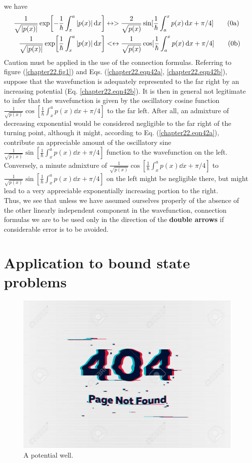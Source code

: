 we have
\begin{align}
\frac{1}{\sqrt{\abs{p(x)}}} \exp[-\frac{1}{\hbar}\int_{x}^{a} \abs{p(x)} \dd{x}] &\leftrightarrow > \frac{2}{\sqrt{p(x)}} \sin[\frac{1}{\hbar}\int_{a}^{x} p(x) \dd{x} + \pi/4] \label{chapter22.eqn43a}
\tag{\theequation a} \\
\frac{1}{\sqrt{\abs{p(x)}}} \exp[\frac{1}{\hbar}\int_{x}^{a} \abs{p(x)} \dd{x}] &<\leftrightarrow  \frac{1}{\sqrt{p(x)}} \cos[\frac{1}{\hbar}\int_{a}^{x} p(x) \dd{x} + \pi/4] \label{chapter22.eqn43b}
\tag{\theequation b} \\
\end{align}
Caution must be applied in the use of the connection formulas. Referring to figure (\ref{chapter22.fig1}) and Eqs. (\ref{chapter22.eqn42a}, \ref{chapter22.eqn42b}), suppose that the wavefunction is adequately represented to the far right by an increasing potential (Eq. \ref{chapter22.eqn42b}). It is then in general not legitimate to infer that the wavefunction is given by the oscillatory cosine function $\frac{1}{\sqrt{p(x)}} \cos[\frac{1}{\hbar}\int_{x}^{a} p(x) \dd{x} + \pi/4]$ to the far left. After all, 
an admixture of decreasing exponential would be considered negligible to the far right of the turning point, although it might, according to Eq. (\ref{chapter22.eqn42a}), contribute an appreciable amount of the oscillatory sine 
$\frac{1}{\sqrt{p(x)}} \sin[\frac{1}{\hbar}\int_{x}^{a} p(x) \dd{x} + \pi/4]$
function to the wavefunction on the left.\\

Conversely, a minute admixture of 
$\frac{1}{\sqrt{p(x)}} \cos[\frac{1}{\hbar}\int_{x}^{a} p(x) \dd{x} + \pi/4]$
to
$\frac{1}{\sqrt{p(x)}} \sin[\frac{1}{\hbar}\int_{x}^{a} p(x) \dd{x} + \pi/4]$
on the left might be negligible there, but might lead to a very appreciable exponentially increasing portion to the right.\\

Thus, we see that unless we have assumed ourselves properly of the absence  of the other linearly independent component in the wavefunction, connection formulas we are to be used only in the direction of the \textbf{double arrows} if considerable error is to be avoided.


\section{Application to bound state problems}
\begin{figure}
	\centering
	\includegraphics[width=0.5\linewidth]{Pictures/not-found.jpg}
	\caption{A potential well.}
	\label{chapter22.fig4}
\end{figure}

